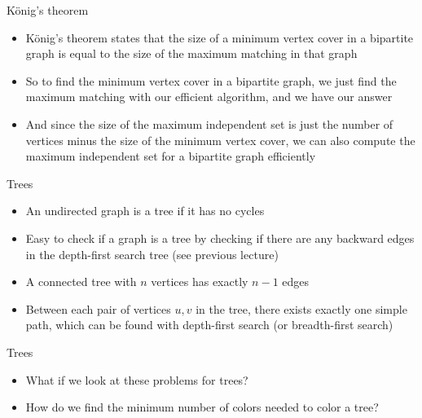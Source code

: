 \documentclass[12pt,t]{beamer}
\newcommand{\bi}{\begin{itemize}}
\newcommand{\ei}{\end{itemize}}
\begin{document}
\begin{frame}{König's theorem}
    \vspace{10pt}
    \bi
        \item König's theorem states that the size of a minimum vertex cover in a bipartite graph is equal to the size of the maximum matching in that graph
        \vspace{10pt}
        \item So to find the minimum vertex cover in a bipartite graph, we just find the maximum matching with our efficient algorithm, and we have our answer
        \item And since the size of the maximum independent set is just the number of vertices minus the size of the minimum vertex cover, we can also compute the maximum independent set for a bipartite graph efficiently
    \ei
\end{frame}

\begin{frame}{Trees}
    \vspace{20pt}
    \bi
\item An undirected graph is a tree if it has no cycles
    \vspace{10pt}
\item Easy to check if a graph is a tree by checking if there are any backward edges in the depth-first search tree (see previous lecture)
\vspace{10pt}
\item A connected tree with $n$ vertices has exactly $n-1$ edges
\vspace{10pt}
\item Between each pair of vertices $u,v$ in the tree, there exists exactly one simple path, which can be found with depth-first search (or breadth-first search)
    \ei
\end{frame}

\begin{frame}{Trees}
    \vspace{10pt}
    \bi
\item What if we look at these problems for trees?
    \vspace{10pt}
\item How do we find the minimum number of colors needed to color a tree?

    \ei
\end{frame}
\end{document}
